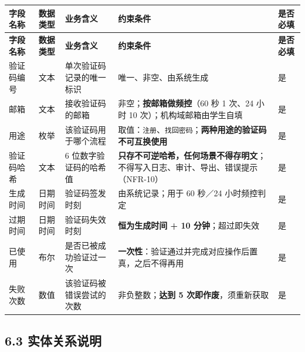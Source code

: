 \documentclass[12pt,a4paper]{ctexart}
\begin{document}
{\footnotesize
\begin{longtable}{|p{1.76cm}|p{1.54cm}|p{3.30cm}|p{7.86cm}|p{1.54cm}|}
\hline
\textbf{字段名称} & \textbf{数据类型} & \textbf{业务含义} & \textbf{约束条件} & \textbf{是否必填} \\
\hline
\endfirsthead
\hline
\textbf{字段名称} & \textbf{数据类型} & \textbf{业务含义} & \textbf{约束条件} & \textbf{是否必填} \\
\hline
\endhead
\hline
\endfoot
验证码编号 & 文本 & 单次验证码记录的唯一标识 & 唯一、非空、由系统生成 & 是 \\
\hline
邮箱 & 文本 & 接收验证码的邮箱 & 非空；\textbf{按邮箱做频控}（60 秒 1 次、24 小时 10 次）；机构域邮箱由学生自填 & 是 \\
\hline
用途 & 枚举 & 该验证码用于哪个流程 & 取值：\texttt{注册}、\texttt{找回密码}；\textbf{两种用途的验证码不可互换使用} & 是 \\
\hline
验证码哈希 & 文本 & 6 位数字验证码的哈希值 & \textbf{只存不可逆哈希，任何场景不得存明文}；不得写入日志、审计、导出、错误提示（NFR-10） & 是 \\
\hline
生成时间 & 日期时间 & 验证码签发时刻 & 由系统记录；用于 60 秒／24 小时频控判定 & 是 \\
\hline
过期时间 & 日期时间 & 验证码失效时刻 & \textbf{恒为生成时间 + 10 分钟}；超过即失效 & 是 \\
\hline
已使用 & 布尔 & 是否已被成功验证过一次 & \textbf{一次性}：验证通过并完成对应操作后置真，之后不得再用 & 是 \\
\hline
失败次数 & 数值 & 该验证码被错误尝试的次数 & 非负整数；\textbf{达到 5 次即作废}，须重新获取 & 是 \\
\hline
\end{longtable}
}


\subsection*{6.3 实体关系说明}
\end{document}
